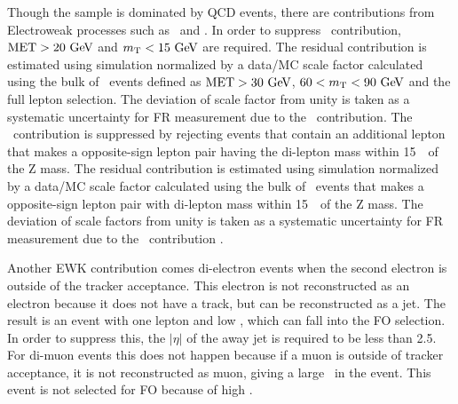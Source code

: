 Though the sample is dominated by QCD 
events, there are contributions from Electroweak processes such as \Wjets\ and \dyll. 
In order to suppress \Wjets\ contribution, $\mathrm{MET}>20~\mathrm{Ge\kern -0.1em V}$ and $m_{\mathrm{T}}<15~\mathrm{Ge\kern -0.1em V}$ are required. 
The residual contribution is estimated using simulation normalized by a data/MC scale factor 
calculated using the bulk of \Wjets\ events defined as $\mathrm{MET}>30~\mathrm{Ge\kern -0.1em V}$, $60<m_{\mathrm{T}}<90~\mathrm{Ge\kern -0.1em V}$ 
and the full lepton selection. The deviation of scale factor from unity 
is taken as a systematic uncertainty for FR measurement due to the \Wjets\ contribution.
The \dyll\ contribution is suppressed by rejecting events 
that contain an additional lepton that makes a opposite-sign lepton pair 
having the di-lepton mass within 15~\GeV\ of the Z mass.  
The residual contribution is estimated using simulation normalized by a data/MC scale factor
calculated using the bulk of \dyll\ events that makes a opposite-sign lepton 
pair with di-lepton mass within 15~\GeV\ of the Z mass.
The deviation of scale factors from unity
is taken as a systematic uncertainty for FR measurement due to the \dyll\ contribution .

Another EWK contribution comes di-electron events when the second electron 
is outside of the tracker acceptance. This electron is not reconstructed 
as an electron because it does not have a track, but can be reconstructed 
as a jet. The result is an event with one lepton and low \met, which 
can fall into the FO selection. In order to suppress this, the $\left| \eta \right|$ 
of the away jet is required to be less than 2.5. For di-muon events 
this does not happen because if a muon is outside of tracker acceptance, 
it is not reconstructed as muon, giving a large \met\ in the event. 
This event is not selected for FO because of high \met. 


